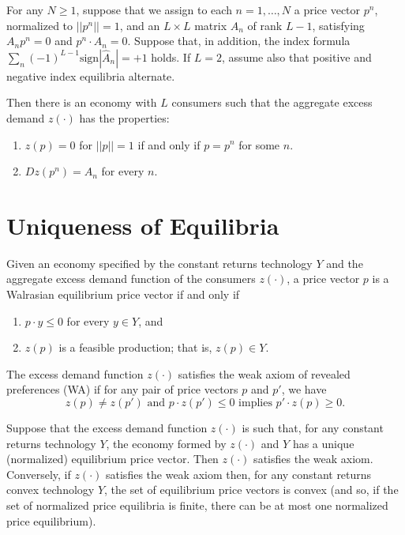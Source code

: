 \begin{prop}
    For any $N \geq 1$, suppose that we assign to each $n = 1, \dots, N$ a price vector $p^n$, normalized to $||p^n|| = 1$, and an $L \times L$ matrix $A_n$ of rank $L - 1$, satisfying $A_n p^n = 0$ and $p^n \cdot A_n = 0$. Suppose that, in addition, the index formula $\sum_n (-1)^{L - 1} \text{sign} | \hat{A}_n | = +1$ holds. If $L = 2$, assume also that positive and negative index equilibria alternate.

    Then there is an economy with $L$ consumers such that the aggregate excess demand $z(\cdot)$ has the properties:
    \begin{enumerate}
        \item $z(p) = 0$ for $||p|| = 1$ if and only if $p = p^n$ for some $n$.
        \item $D z(p^n) = A_n$ for every $n$.
    \end{enumerate}
\end{prop}


\section{Uniqueness of Equilibria}

\begin{prop}
    Given an economy specified by the constant returns technology $Y$ and the aggregate excess demand function of the consumers $z(\cdot)$, a price vector $p$ is a Walrasian equilibrium price vector if and only if 
    \begin{enumerate}
        \item $p \cdot y \leq 0$ for every $y \in Y$, and
        \item $z(p)$ is a feasible production; that is, $z(p) \in Y$.
    \end{enumerate}
\end{prop}

\begin{defn}
    The excess demand function $z(\cdot)$ satisfies the weak axiom of revealed preferences (WA) if for any pair of price vectors $p$ and $p'$, we have
    \begin{equation*}
        z(p) \neq z(p') \text{ and } p \cdot z(p') \leq 0 \text{ implies } p' \cdot z(p) \geq 0.
    \end{equation*}
\end{defn}

\begin{prop}
    Suppose that the excess demand function $z(\cdot)$ is such that, for any constant returns technology $Y$, the economy formed by $z(\cdot)$ and $Y$ has a unique (normalized) equilibrium price vector. Then $z(\cdot)$ satisfies the weak axiom. Conversely, if $z(\cdot)$ satisfies the weak axiom then, for any constant returns convex technology $Y$, the set of equilibrium price vectors is convex (and so, if the set of normalized price equilibria is finite, there can be at most one normalized price equilibrium).
\end{prop}

